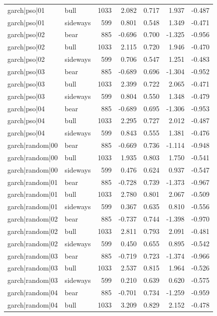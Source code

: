 \begin{table}
\begin{tabular}{llrrrrr}
garch|pso|01 & bull & 1033 & 2.082 & 0.717 & 1.937 & -0.487 \\
garch|pso|01 & sideways & 599 & 0.801 & 0.548 & 1.349 & -0.471 \\
garch|pso|02 & bear & 885 & -0.696 & 0.700 & -1.325 & -0.956 \\
garch|pso|02 & bull & 1033 & 2.115 & 0.720 & 1.946 & -0.470 \\
garch|pso|02 & sideways & 599 & 0.706 & 0.547 & 1.251 & -0.483 \\
garch|pso|03 & bear & 885 & -0.689 & 0.696 & -1.304 & -0.952 \\
garch|pso|03 & bull & 1033 & 2.399 & 0.722 & 2.065 & -0.471 \\
garch|pso|03 & sideways & 599 & 0.804 & 0.550 & 1.348 & -0.479 \\
garch|pso|04 & bear & 885 & -0.689 & 0.695 & -1.306 & -0.953 \\
garch|pso|04 & bull & 1033 & 2.295 & 0.727 & 2.012 & -0.487 \\
garch|pso|04 & sideways & 599 & 0.843 & 0.555 & 1.381 & -0.476 \\
garch|random|00 & bear & 885 & -0.669 & 0.736 & -1.114 & -0.948 \\
garch|random|00 & bull & 1033 & 1.935 & 0.803 & 1.750 & -0.541 \\
garch|random|00 & sideways & 599 & 0.476 & 0.624 & 0.937 & -0.547 \\
garch|random|01 & bear & 885 & -0.728 & 0.739 & -1.373 & -0.967 \\
garch|random|01 & bull & 1033 & 2.780 & 0.801 & 2.067 & -0.509 \\
garch|random|01 & sideways & 599 & 0.367 & 0.635 & 0.810 & -0.556 \\
garch|random|02 & bear & 885 & -0.737 & 0.744 & -1.398 & -0.970 \\
garch|random|02 & bull & 1033 & 2.811 & 0.793 & 2.091 & -0.481 \\
garch|random|02 & sideways & 599 & 0.450 & 0.655 & 0.895 & -0.542 \\
garch|random|03 & bear & 885 & -0.719 & 0.723 & -1.374 & -0.966 \\
garch|random|03 & bull & 1033 & 2.537 & 0.815 & 1.964 & -0.526 \\
garch|random|03 & sideways & 599 & 0.210 & 0.639 & 0.620 & -0.575 \\
garch|random|04 & bear & 885 & -0.701 & 0.734 & -1.259 & -0.959 \\
garch|random|04 & bull & 1033 & 3.209 & 0.829 & 2.152 & -0.478 \\

\end{tabular}
\end{table}
